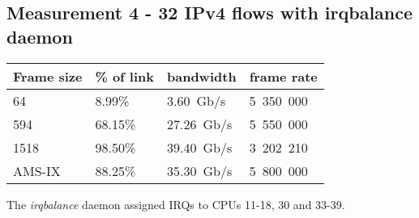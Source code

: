 
\subsection{Measurement 4 - 32 IPv4 flows with irqbalance daemon}

\begin{tabular}{ | l | l | l | l | }
\hline
Frame size & \% of link & bandwidth & frame rate \\
\hline
64     &  8.99\% &  3.60~Gb/s & 5~350~000 \\
594    & 68.15\% & 27.26~Gb/s & 5~550~000 \\
1518   & 98.50\% & 39.40~Gb/s & 3~202~210 \\
AMS-IX & 88.25\% & 35.30~Gb/s & 5~800~000 \\
\hline
\end{tabular}

The {\it{irqbalance}} daemon assigned IRQs to CPUs 11-18, 30 and 33-39.

\newpage

